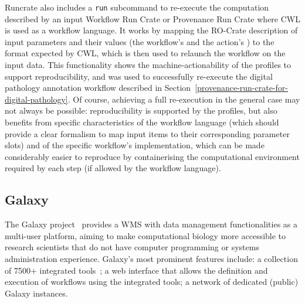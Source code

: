 \documentclass[10pt,letterpaper]{article}
\newcommand{\termsorg}[1]{\href{https://schema.org/#1}{\color{black}{\emph{s:#1}}}}
\newcommand{\termbsp}[1]{\href{https://bioschemas.org/properties/#1}{\color{black}{\emph{bsp:#1}}}}
\begin{document}
Runcrate also includes a \texttt{run} subcommand to re-execute the computation described by an input Workflow Run Crate or Provenance Run Crate where CWL is used as a workflow language.
It works by mapping the RO-Crate description of input parameters and their values (the workflow's
\termbsp{input} and the action's \termsorg{object}) to the format expected by CWL, which is then used to relaunch the workflow on the input data.
This functionality shows the machine-actionability of the profiles to support reproducibility, and was used to successfully re-execute the digital pathology annotation workflow described in Section~\ref{provenance-run-crate-for-digital-pathology}.
%
Of course, achieving a full re-execution in the general case may not always be possible: reproducibility is supported by the profiles, but also benefits from specific characteristics of the workflow language (which should provide a clear formalism to map input items to their corresponding parameter slots) and of the specific workflow's implementation, which can be made considerably easier to reproduce by containerising the computational environment required by each step (if allowed by the workflow language).


\subsection{Galaxy}\label{galaxy}

The Galaxy project~\cite{Galaxy 2022} provides a WMS with data management functionalities as a multi-user platform, aiming to make computational biology more accessible to research scientists that do not have computer programming or systems administration experience.
Galaxy's most prominent features include: a collection of 7500+ integrated tools~\cite{Blankenberg 2014};
a web interface that allows the definition and execution of workflows using the integrated tools; a network of dedicated (public) Galaxy instances.
\end{document}
